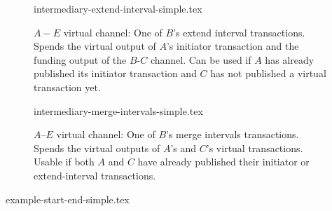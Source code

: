   \begin{figure}
    {intermediary-extend-interval-simple.tex}
    \caption{$A-E$ virtual channel: One of $B$'s extend interval
    transactions. Spends the virtual output of $A$'s
    initiator transaction and the funding output of the $B$-$C$ channel. Can be
    used if $A$ has already published its initiator transaction and $C$ has not
    published a virtual transaction yet.}
    \label{figure:virtual-layer-extend-interval-simple}
  \end{figure}

  \begin{figure}
    {intermediary-merge-intervals-simple.tex}
    \caption{$A$--$E$ virtual channel: One of $B$'s merge intervals
    transactions. Spends the virtual outputs of $A$'s and $C$'s virtual
    transactions. Usable if both $A$ and $C$ have already published their
    initiator or extend-interval transactions.}
    \label{figure:virtual-layer-merge-intervals-simple}
  \end{figure}

  \begin{figure*}
    {example-start-end-simple.tex}
    \caption{$4$ simple channels supporting a virtual. $A$ starts closing by
    publishing its initiator tx, then parties $B$--$D$ each publishes its
    extend-interval tx with the relevant interval. No party stays inactive.
    Virtual outputs are marked with their interval. \emph{Bridge} txs
    (such as $b$) are needed to convert the various virtual outputs into the
    same funding output, as \texttt{ANYPREVOUT} only works across identical
    outputs.}
    \label{figure:example-start-end-simple}
  \end{figure*}

